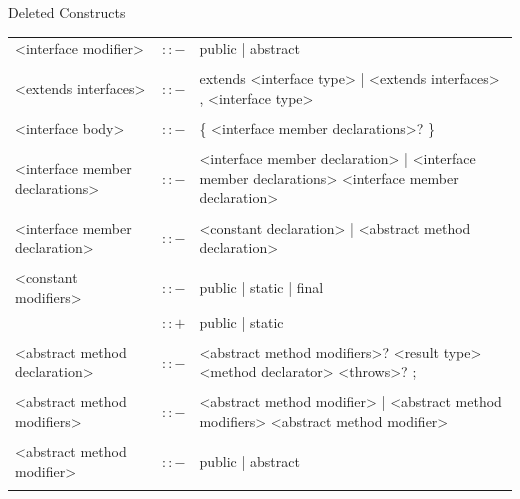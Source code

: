\documentclass[landscape, 11pt]{article}
\begin{document}
\begin{qsection}{Deleted Constructs}
\begin{enumerate}[label=\bt{\theenumi.}]
\begin{longtable}{R{7cm} c L{15cm}}
				<interface modifier>						&	$\colon\colon-$	&	public | abstract \\\\
				<extends interfaces>						&	$\colon\colon-$	&	extends <interface type> | <extends interfaces> , <interface type> \\\\
				<interface body>							&	$\colon\colon-$	&	\{ <interface member declarations>? \} \\\\
				<interface member declarations>				&	$\colon\colon-$	&	<interface member declaration> | <interface member declarations> <interface member declaration> \\\\
				<interface member declaration>				&	$\colon\colon-$	&	<constant declaration> | <abstract method declaration> \\\\
				<constant modifiers>						&	$\colon\colon-$	&	public | static | final \\
															&	$\colon\colon+$	&	public | static \\\\
				<abstract method declaration>				&	$\colon\colon-$	&	<abstract method modifiers>? <result type> <method declarator> <throws>? ; \\\\
				<abstract method modifiers>					&	$\colon\colon-$	&	<abstract method modifier> | <abstract method modifiers> <abstract method modifier> \\\\
				<abstract method modifier>					&	$\colon\colon-$	&	public | abstract \\\\
			\end{longtable}



\end{enumerate}
\end{qsection}
\end{document}

